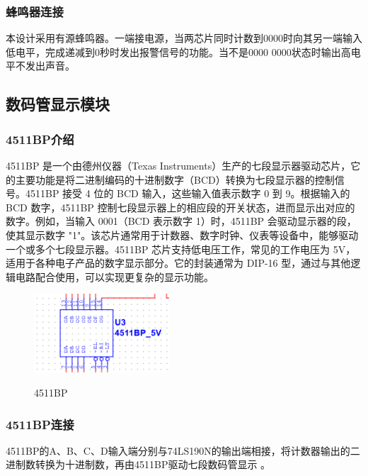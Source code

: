 \documentclass[12p,UTF8]{article}
\begin{document}
\begin{spacing}{1.25}
  \subsubsection{蜂鸣器连接}
  本设计采用有源蜂鸣器。一端接电源，当两芯片同时计数到0000时向其另一端输入低电平，完成递减到0秒时发出报警信号的功能。当不是0000 0000状态时输出高电平不发出声音。

  \subsection{数码管显示模块}
  \subsubsection{4511BP介绍}
  4511BP 是一个由德州仪器（Texas Instruments）生产的七段显示器驱动芯片，它的主要功能是将二进制编码的十进制数字（BCD）转换为七段显示器的控制信号。4511BP 接受 4 位的 BCD 输入，这些输入值表示数字 0 到 9。根据输入的 BCD 数字，4511BP 控制七段显示器上的相应段的开关状态，进而显示出对应的数字。例如，当输入 0001（BCD 表示数字 1）时，4511BP 会驱动显示器的段，使其显示数字 "1"。该芯片通常用于计数器、数字时钟、仪表等设备中，能够驱动一个或多个七段显示器。4511BP 芯片支持低电压工作，常见的工作电压为 5V，适用于各种电子产品的数字显示部分。它的封装通常为 DIP-16 型，通过与其他逻辑电路配合使用，可以实现更复杂的显示功能。
  \begin{figure}[H]
    \centering  %
    \label{4511BP}
    \includegraphics[width=0.45\textwidth]{4511BP}
    \caption{4511BP}
    \label{4511BP}
  \end{figure}
  \subsubsection{4511BP连接}
  4511BP的A、B、C、D输入端分别与74LS190N的输出端相接，将计数器输出的二进制数转换为十进制数，再由4511BP驱动七段数码管显示
  。

\end{spacing}
\end{document}
